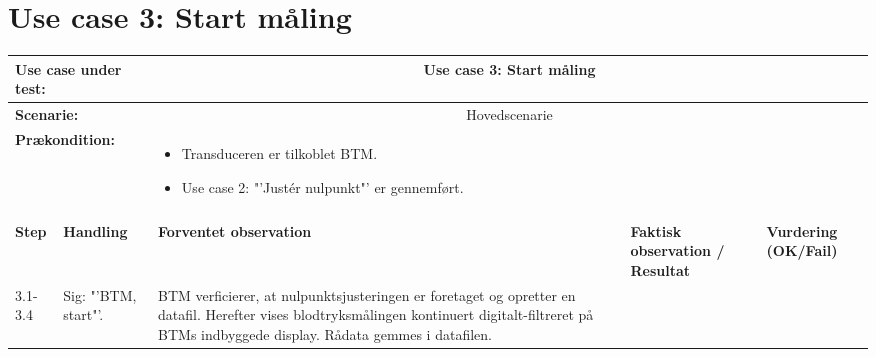 \section{Use case 3: Start måling}
\begin{tabular}{|p{1cm}|p{3cm}|p{4cm}|p{4cm}|p{2cm}|}
\hline
\multicolumn{2}{|p{3cm}|}{\textbf{Use case under test:}} & \multicolumn{3}{c|}{Use case 3: Start måling} \\\hline

\multicolumn{2}{|p{3cm}|}{\textbf{Scenarie:}} & \multicolumn{3}{c|}{Hovedscenarie} \\\hline

\multicolumn{2}{|p{3cm}|}{\textbf{Prækondition:}}  & \multicolumn{3}{l|}{\parbox{0.6\textwidth}{
\begin{itemize}[label=$\circ$]
\item Transduceren er tilkoblet BTM.
\item Use case 2: "'Justér nulpunkt"' er gennemført.  
\end{itemize} }}\\\hline

\multicolumn{5}{|c|}{} \\\hline

\textbf{Step} & \textbf{Handling} & \textbf{Forventet observation} & \textbf{Faktisk observation / Resultat} & \textbf{Vurdering (OK/Fail)}\\\hline

3.1-3.4 & Sig: "'BTM, start"'. & BTM verficierer, at nulpunktsjusteringen er foretaget og opretter en datafil. Herefter vises blodtryksmålingen kontinuert digitalt-filtreret på BTMs indbyggede display. Rådata gemmes i datafilen. &  & \\\hline
\end{tabular}



